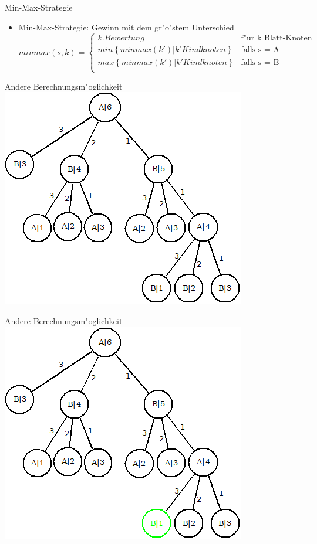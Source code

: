 \documentclass[18pt]{beamer}
\begin{document}
\begin{frame}{Min-Max-Strategie}
\begin{itemize}
\item Min-Max-Strategie: Gewinn mit dem gr"o"stem Unterschied
\begin{equation}
   minmax(s,k) =
   \begin{cases}
     k.Bewertung & \text{f"ur k Blatt-Knoten} \\
     min\left\{minmax(k') | k' Kindknoten\right\} & \text{falls s = A} \\
     max\left\{minmax(k') | k' Kindknoten\right\} & \text{falls s = B} \\
   \end{cases}
\end{equation}
\end{itemize}
\end{frame}

\begin{frame}{Andere Berechnungsm"oglichkeit}
\includegraphics[scale=0.4]{baum0.png}
\end{frame}

\begin{frame}{Andere Berechnungsm"oglichkeit}
\includegraphics[scale=0.4]{baum1.png}
\end{frame}
\end{document}
